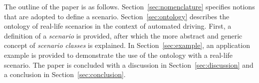 The outline of the paper is as follows. Section~\ref{sec:nomenclature} specifies notions that are adopted to define a scenario. Section~\ref{sec:ontology} describes the ontology of real-life scenarios in the context of automated driving. First, a definition of a \emph{scenario} is provided, after which the more abstract and generic concept of \emph{scenario classes} is explained. In Section~\ref{sec:example}, an application example is provided to demonstrate the use of the ontology with a real-life scenario. The paper is concluded with a discussion in Section~\ref{sec:discussion} and a conclusion in Section~\ref{sec:conclusion}.
